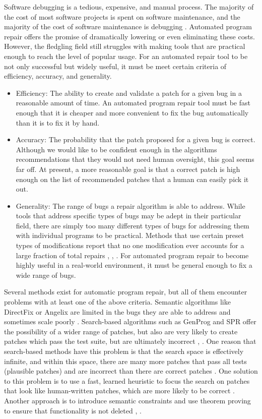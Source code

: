 \documentclass{paper}
\begin{document}
Software debugging is a tedious, expensive, and manual process. 
The majority of the cost of most software projects is spent on software maintenance, and the majority of the cost of software maintenance is debugging \cite{Genprog}. 
Automated program repair offers the promise of dramatically lowering or even eliminating these costs. 
However, the fledgling field still struggles with making tools that are practical enough to reach the level of popular usage. 
For an automated repair tool to be not only successful but widely useful, it must be meet certain criteria of efficiency, accuracy, and generality.
\begin{itemize}
\item Efficiency: 
	The ability to create and validate a patch for a given bug in a reasonable amount of time. An automated program repair tool must be fast enough that it is cheaper and more convenient to fix the bug automatically than it is to fix it by hand.
	
\item Accuracy: 
The probability that the patch proposed for a given bug is correct. 
Although we would like to be confident enough in the algorithms recommendations that they would not need human oversight, this goal seems far off. 
At present, a more reasonable goal is that a correct patch is high enough  on the list of recommended patches that a human can easily pick it out. 
\item Generality: 
The range of bugs a repair algorithm is able to address. 
While tools that address specific types of bugs may be adept in their particular field, there are simply too many different types of bugs for addressing them with individual programs to be practical. 
Methods that use certain preset types of modifications report that no one modification ever accounts for a large fraction of total repairs \cite{PAR}, \cite{History Driven Program Repair}, \cite{SPR}. 
For automated program repair to become highly useful in a real-world environment, it must be general enough to fix a wide range of bugs.
\end{itemize}


Several methods exist for automatic program repair, but all of them encounter problems with at least one of the above criteria. 
Semantic algorithms like DirectFix or Angelix are limited in the bugs they are able to address and sometimes scale poorly \cite{Angelix}. 
Search-based algorithms such as GenProg and SPR offer the possibility of a wider range of patches, but also are very likely to create patches which pass the test suite, but are ultimately incorrect \cite{Angelix}, \cite{SPR} \cite{Genprog}. One reason that search-based methods have this problem is that the search space is effectively infinite, and within this space, there are many more patches that pass all tests (plausible patches) and are incorrect than there are correct patches \cite{Analysis of search space}. 
One solution to this problem is to use a fast, learned heuristic to focus the search on patches that look like human-written patches, which are more likely to be correct \cite{Prophet}. 
Another approach is to introduce semantic constraints and use theorem proving to ensure that functionality is not deleted \cite{SearchRepair}, \cite{SR thesis}. 
\end{document}
